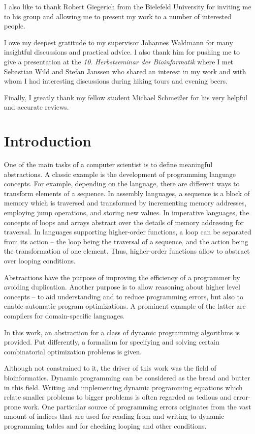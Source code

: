 \documentclass[
    a4paper,
    12pt,
    twoside,
    BCOR=12mm,
    parskip=half,
    chapterprefix,
    numbers=noenddot,
    bibliography=totoc
]{scrbook}
\begin{document}
I also like to thank Robert Giegerich from the Bielefeld University for inviting me to his group and allowing me to present my work to a number of interested people.

I owe my deepest gratitude to my supervisor Johannes Waldmann for many insightful discussions and practical advice. I also thank him for pushing me to give a presentation at the \emph{10. Herbstseminar der Bioinformatik} where I met Sebastian Wild and Stefan Janssen who shared an interest in my work and with whom I had interesting discussions during hiking tours and evening beers.

Finally, I greatly thank my fellow student Michael Schmeißer for his very helpful and accurate reviews.

\mainmatter
\chapter{Introduction}

\linespread{1.02}\selectfont

One of the main tasks of a computer scientist is to define meaningful abstractions. A classic example is the development of programming language concepts. For example, depending on the language, there are different ways to transform elements of a sequence. In assembly languages, a sequence is a block of memory which is traversed and transformed by incrementing memory addresses, employing jump operations, and storing new values. In imperative languages, the concepts of loops and arrays abstract over the details of memory addressing for traversal. In languages supporting higher-order functions, a loop can be separated from its action -- the loop being the traversal of a sequence, and the action being the transformation of one element. Thus, higher-order functions allow to abstract over looping conditions.

Abstractions have the purpose of improving the efficiency of a programmer by avoiding duplication. Another purpose is to allow reasoning about higher level concepts -- to aid understanding and to reduce programming errors, but also to enable automatic program optimizations. A prominent example of the latter are compilers for domain-specific languages.

In this work, an abstraction for a class of dynamic programming algorithms is provided. Put differently, a formalism for specifying and solving certain combinatorial optimization problems is given.

Although not constrained to it, the driver of this work was the field of bioinformatics. Dynamic programming can be considered as the bread and butter in this field. Writing and implementing dynamic programming equations which relate smaller problems to bigger problems is often regarded as tedious and error-prone work. One particular source of programming errors originates from the vast amount of indices that are used for reading from and writing to dynamic programming tables and for checking looping and other conditions.
\end{document}

